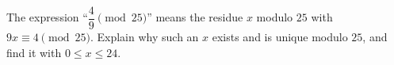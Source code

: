 The expression ``$\dfrac{4}{9}\pmod{25}$'' means the residue $x$ modulo $25$ with $9x\equiv4\pmod{25}$. Explain why such an $x$ exists and is unique modulo $25$, and find it with $0\le x\le24$.
